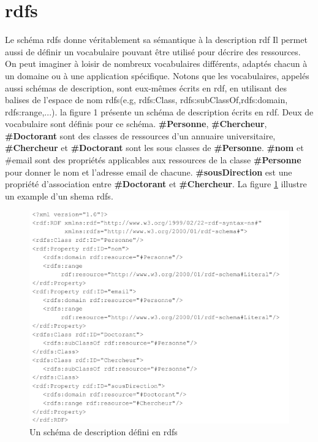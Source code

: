 \documentclass[12pt]{report}
\begin{document}
\section{\acs{rdfs}}
Le schéma \acs{rdfs} donne véritablement sa sémantique à la description \acs{rdf}\cite{RDFS}
Il permet aussi de définir un vocabulaire pouvant être utilisé pour décrire des
ressources.
On peut imaginer à loisir de nombreux vocabulaires différents, adaptés chacun à
un domaine ou à une application spécifique. Notons que les vocabulaires,
appelés aussi schémas de description, sont eux-mêmes écrits en \acs{rdf}, en
utilisant des balises de l'espace de nom \acs{rdfs}(e.g, rdfs:Class,
rdfs:subClassOf,rdfs:domain, rdfs:range,...). la figure 1 présente un schéma de
description écrits en \acs{rdf}. Deux de vocabulaire sont définis pour ce schéma.
\textbf{\#Personne}, \textbf{\#Chercheur}, \textbf{\#Doctorant} sont des classes de ressources d'un
annuaire universitaire, \textbf{\#Chercheur} et \textbf{\#Doctorant} sont les sous classes de
\textbf{\#Personne}. \textbf{\#nom} et {\#email} sont des propriétés applicables aux ressources de la
classe \textbf{\#Personne} pour donner le nom et l'adresse email de chacune.
\textbf{\#sousDirection} est une propriété d'association entre \textbf{\#Doctorant} et
\textbf{\#Chercheur}. La figure \ref{rdfs_example} illustre un example d'un shema \acs{rdfs}.
\begin{figure}[H]
\centering
\includegraphics[width=\textwidth]{rdfs_example.png}
\caption{Un schéma de description défini en \acs{rdfs}}\label{rdfs_example}
\end{figure}
\end{document}

